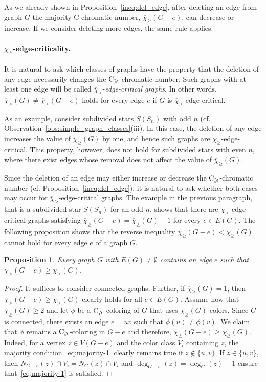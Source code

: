 \documentclass{article}
\newtheorem{proposition}[theorem]{Proposition}
\theoremstyle{definition}
\newcommand{\mc}{\overline{\chi}_{\geqslant}}
\newcommand{\cg}{{\rm C}_{\geqslant}}
\begin{document}
As we already shown in Proposition~\ref{ineq:del_edge}, after deleting an edge from graph $G$ the majority C-chromatic number, $\mc(G-e)$,  can decrease or increase. If we consider deleting more edges, the same rule applies. 

\paragraph{$\mc$-edge-criticality.}
It is natural to ask which classes of graphs have the property that the deletion of any edge necessarily changes the $\cg$-chromatic number. Such graphs with at least one edge will be called $\mc$-\emph{edge-critical graphs}. In other words, $\mc(G)\neq \mc(G-e)$ holds for every edge $e$ if $G$ is $\mc$-edge-critical. 

As an example, consider subdivided stars $S(S_n)$ with odd $n$ (cf. Observation~\ref{obs:simple_graph_classes}(iii). In this case, the deletion of any edge increases the value of $\mc(G)$ by one, and hence such graphs are $\mc$-edge-critical. This property, however, does not hold for subdivided stars with even $n$, where there exist edges whose removal does not affect the value of $\mc(G)$.

Since the deletion of an edge may either increase or decrease the $\cg$-chromatic number (cf. Proposition~\ref{ineq:del_edge}), it is natural to ask whether both cases may occur for $\mc$-edge-critical graphs. The example in the previous paragraph, that is a subdivided star $S(S_n)$ for an odd $n$, shows that there are $\mc$-edge-critical graphs satisfying $\mc(G-e)= \mc(G)+1$ for every $e \in E(G)$. The following proposition shows that the reverse inequality $\mc(G-e) < \mc(G)$ cannot hold for every edge $e$ of a graph $G$.
\begin{proposition} \label{prop:critical}
Every graph $G$ with $E(G)\neq \emptyset$ contains an edge $e$ such that $\mc(G-e) \ge \mc(G)$.  
\end{proposition}
\begin{proof}
  It suffices to consider connected graphs. Further, if $\mc(G)=1$, then $\mc(G-e) \ge \mc(G)$ clearly holds for all $e \in E(G)$. Assume now that $\mc(G) \ge 2$ and let $\phi$ be a $\cg$-coloring of $G$ that uses $\mc(G)$ colors. Since $G$ is connected, there exists an edge $e=uv$ such that $\phi(u) \neq \phi(v)$. We claim that $\phi$ remains a $\cg$-coloring in $G-e$ and therefore, $\mc(G-e) \ge \mc(G)$. Indeed, for a vertex $z \in V(G-e)$ and the color class $V_i$ containing $z$, the majority condition~\eqref{eq:majority-1} clearly remains true if $z \notin \{u,v\}$. If $z\in \{u,v\}$, then $N_{G-e}(z) \cap V_i= N_G(z) \cap V_i$ and $\deg_{G-e}(z) = \deg_{G}(z)-1$ ensure that~\eqref{eq:majority-1} is satisfied. 
\end{proof}
\end{document}

